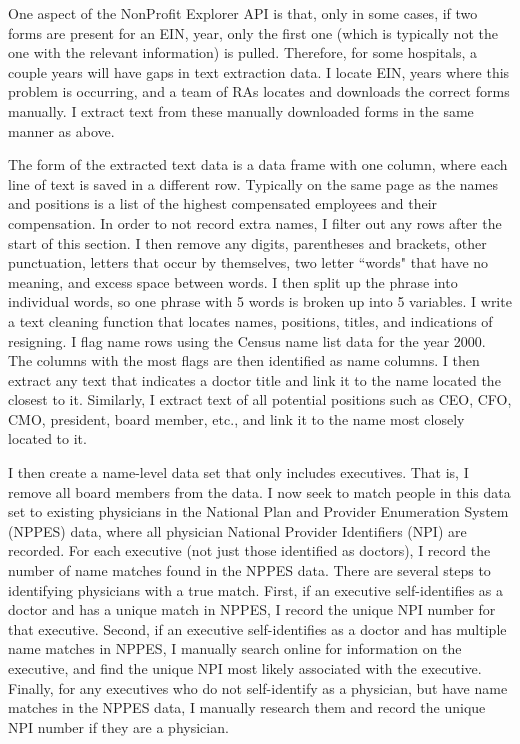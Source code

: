 \documentclass[12pt]{article}
\begin{document}
One aspect of the NonProfit Explorer API is that, only in some cases, if two forms are present for an EIN, year, only the first one (which is typically not the one with the relevant information) is pulled. Therefore, for some hospitals, a couple years will have gaps in text extraction data. I locate EIN, years where this problem is occurring, and a team of RAs locates and downloads the correct forms manually. I extract text from these manually downloaded forms in the same manner as above. 

The form of the extracted text data is a data frame with one column, where each line of text is saved in a different row. Typically on the same page as the names and positions is a list of the highest compensated employees and their compensation. In order to not record extra names, I filter out any rows after the start of this section. I then remove any digits, parentheses and brackets, other punctuation, letters that occur by themselves, two letter ``words" that have no meaning, and excess space between words. I then split up the phrase into individual words, so one phrase with 5 words is broken up into 5 variables. I write a text cleaning function that locates names, positions, titles, and indications of resigning. I flag name rows using the Census name list data for the year 2000. The columns with the most flags are then identified as name columns. I then extract any text that indicates a doctor title and link it to the name located the closest to it. Similarly, I extract text of all potential positions such as CEO, CFO, CMO, president, board member, etc., and link it to the name most closely located to it. 

I then create a name-level data set that only includes executives. That is, I remove all board members from the data. I now seek to match people in this data set to existing physicians in the National Plan and Provider Enumeration System (NPPES) data, where all physician National Provider Identifiers (NPI) are recorded. For each executive (not just those identified as doctors), I record the number of name matches found in the NPPES data. There are several steps to identifying physicians with a true match. First, if an executive self-identifies as a doctor and has a unique match in NPPES, I record the unique NPI number for that executive. Second, if an executive self-identifies as a doctor and has multiple name matches in NPPES, I manually search online for information on the executive, and find the unique NPI most likely associated with the executive. Finally, for any executives who do not self-identify as a physician, but have name matches in the NPPES data, I manually research them and record the unique NPI number if they are a physician. 
\end{document}
